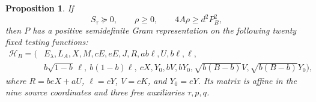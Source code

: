 \documentclass[10pt]{article}
\newtheorem{proposition}{Proposition}
\begin{document}
\begin{proposition}
If
\begin{equation}
 S_\tau\succeq0,\qquad \rho\geq0,\qquad
 4A\rho\geq d^2P_B^2,                         \label{eq:admission}
\end{equation}
then $P$ has a positive semidefinite Gram representation on the following
twenty fixed testing functions:
\begin{align}
 \mathcal H_B=\big(&E_\lambda,L_A,X,M,cE,eE,J,R,ab\ell,U,b\ell,\ell,
 \nonumber\\[-2pt]
 &b\sqrt{1-b}\,\ell,\ b(1-b)\ell,\ cX,Y_0,bV,bY_0,
 \sqrt{b(B-b)}V,\sqrt{b(B-b)}Y_0\big),        \label{eq:features}
\end{align}
where $R=beX+aU$, $\ell=cY$, $V=cK$, and $Y_0=eY$.
Its matrix is affine in the nine source coordinates and three free
auxiliaries $\tau,p,q$.
\end{proposition}
\end{document}
